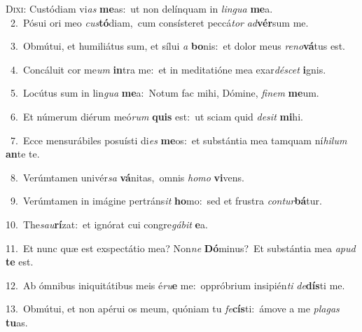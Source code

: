 \lettrine{\initial\textcolor{\initialcolor}{D}}{ixi:} Custódiam vi\textit{as} \textbf{me}\-as:~\star ut non delínquam in \textit{lin}\-\textit{gua} \textbf{me}\-a.\\
{\numbfont\textcolor{\numbcolor}{~2.}}~Pósui ori meo \textit{cus}\-\textbf{tó}diam,~\star cum consísteret peccá\textit{tor} \textit{ad}\-\textbf{vér}sum me.\par
{\numbfont\textcolor{\numbcolor}{~3.}}~Obmútui, et humiliátus sum, et sílui \textit{a} \textbf{bo}\-nis:~\star et dolor meus \textit{re}\-\textit{no}\textbf{vá}tus est.\par
{\numbfont\textcolor{\numbcolor}{~4.}}~Concáluit cor me\textit{um} \textbf{in}\-tra me:~\star et in meditatióne mea exar\-\textit{dé}\-\textit{scet} \textbf{i}\-gnis.\par
{\numbfont\textcolor{\numbcolor}{~5.}}~Locútus sum in lin\textit{gua} \textbf{me}\-a:~\star Notum fac mihi, Dómine, \textit{fi}\-\textit{nem} \textbf{me}\-um.\par
{\numbfont\textcolor{\numbcolor}{~6.}}~Et númerum diérum meó\textit{rum} \textbf{quis} est:~\star ut sciam quid \textit{de}\-\textit{sit} \textbf{mi}\-hi.\par
{\numbfont\textcolor{\numbcolor}{~7.}}~Ecce mensurábiles posuísti di\textit{es} \textbf{me}\-os:~\star et substántia mea tamquam ní\-\textit{hi}\-\textit{lum} \textbf{an}\-te te.\par
{\numbfont\textcolor{\numbcolor}{~8.}}~Verúmtamen univér\textit{sa} \textbf{vá}\-nitas,~\star omnis \textit{ho}\-\textit{mo} \textbf{vi}\-vens.\par
{\numbfont\textcolor{\numbcolor}{~9.}}~Verúmtamen in imágine pertráns\textit{it} \textbf{ho}\-mo:~\star sed et frustra \textit{con}\-\textit{tur}\textbf{bá}tur.\par
{\numbfont\textcolor{\numbcolor}{10.}}~The\-\textit{sau}\-\textbf{rí}zat:~\star et ignórat cui congre\-\textit{gá}\-\textit{bit} \textbf{e}\-a.\par
{\numbfont\textcolor{\numbcolor}{11.}}~Et nunc quæ est exspectátio mea? Non\textit{ne} \textbf{Dó}\-minus?~\star Et substántia mea \textit{a}\-\textit{pud} \textbf{te} est.\par
{\numbfont\textcolor{\numbcolor}{12.}}~Ab ómnibus iniquitátibus meis é\-\textit{ru}\-\textbf{e} me:~\star oppróbrium insipién\textit{ti} \textit{de}\-\textbf{dís}ti me.\par
{\numbfont\textcolor{\numbcolor}{13.}}~Obmútui, et non apérui os meum, quóniam tu \textit{fe}\-\textbf{cís}ti:~\star ámove a me \textit{pla}\-\textit{gas} \textbf{tu}\-as.\par
